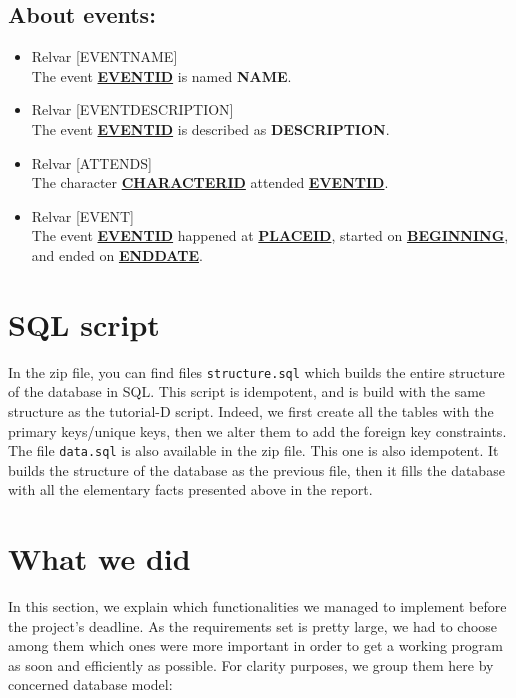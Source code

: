 \documentclass[a4paper ,12pt,french]{article}
\begin{document}
\subsection*{About events:}
\begin{itemize}
\item Relvar [EVENTNAME] \\   The event \underline{\textbf{EVENTID}} is named \textbf{NAME}.
\item Relvar [EVENTDESCRIPTION] \\   The event \underline{\textbf{EVENTID}} is described as \textbf{DESCRIPTION}.
\item Relvar [ATTENDS] \\   The character \underline{\textbf{CHARACTERID}} attended \underline{\textbf{EVENTID}}.
\item Relvar [EVENT] \\   The event \underline{\textbf{EVENTID}} happened at \underline{\textbf{PLACEID}}, started on \underline{\textbf{BEGINNING}}, and ended on \underline{\textbf{ENDDATE}}.
\end{itemize}

\section{SQL script}

In the zip file, you can find files \texttt{structure.sql} which builds the entire structure of the database in SQL. This script is idempotent, and is build with the same structure as the tutorial-D script. Indeed, we first create all the tables with the primary keys/unique keys, then we alter them to add the foreign key constraints.\\


The file \texttt{data.sql} is also available in the zip file. This one is also idempotent. It builds the structure of the database as the previous file, then it fills the database with all the elementary facts presented above in the report.

\section{What we did}

In this section, we explain which functionalities we managed to implement before the project’s deadline. As the requirements set is pretty large, we had to choose among them which ones were more important in order to get a working program as soon and efficiently as possible. For clarity purposes, we group them here by concerned database model:
\end{document}
